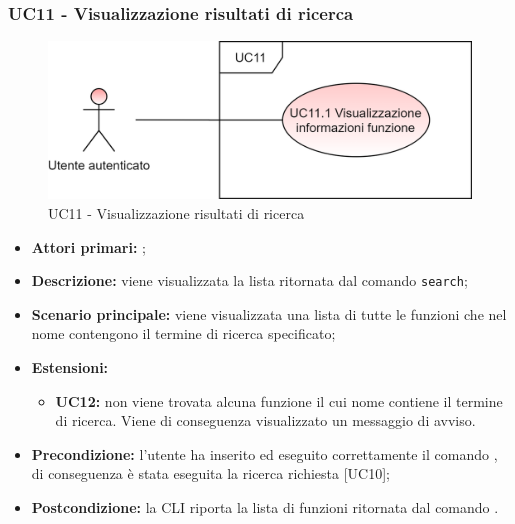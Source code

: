 \subsubsection{UC11 - Visualizzazione risultati di ricerca}
\begin{figure}[H]
	\centering
	\includegraphics[scale=\ucs]{./res/img/UC11.png}
	\caption {UC11 - Visualizzazione risultati di ricerca}
\end{figure}
\begin{itemize}
	\item \textbf{Attori primari:} \ua{};
	\item \textbf{Descrizione:} viene visualizzata la lista ritornata dal comando \texttt{search};
	\item \textbf{Scenario principale:} viene visualizzata una lista di tutte le funzioni che nel nome contengono il termine di ricerca specificato;
	\item \textbf{Estensioni:} 
	\begin{itemize}
		\item \textbf{UC12:} non viene trovata alcuna funzione il cui nome contiene il termine di ricerca. Viene di conseguenza visualizzato un messaggio di avviso.
	\end{itemize}
	\item \textbf{Precondizione:} l’utente ha inserito ed eseguito correttamente il comando \search{}, di conseguenza è stata eseguita la ricerca richiesta [UC10];
	\item \textbf{Postcondizione:} la CLI riporta la lista di funzioni ritornata dal comando \search{}.
\end{itemize}